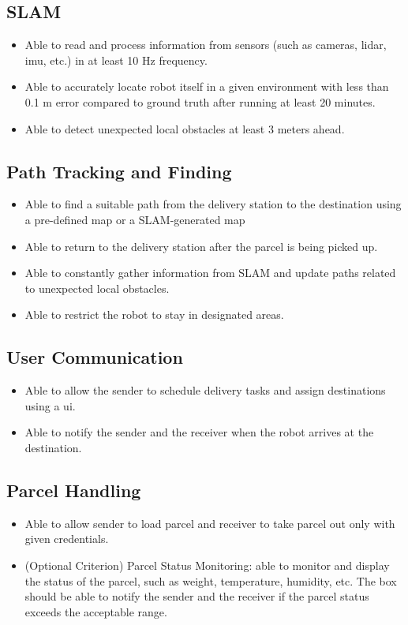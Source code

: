 \documentclass[12pt]{article}
\begin{document}
    \subsection{SLAM}
        \begin{itemize}
            \item Able to read and process information from sensors (such as cameras, \acrshort{lidar}, \acrshort{imu}, etc.) in at least 10 Hz frequency.
            \item Able to accurately locate robot itself in a given environment with less than 0.1 m error compared to ground truth after running at least 20 minutes.
            \item Able to detect unexpected local obstacles at least 3 meters ahead.
        \end{itemize}
    \subsection{Path Tracking and Finding}
        \begin{itemize}
            \item Able to find a suitable path from the delivery station to the destination using a pre-defined map or a SLAM-generated map
            \item Able to return to the delivery station after the parcel is being picked up.
            \item Able to constantly gather information from SLAM and update paths related to unexpected local obstacles.
            \item Able to restrict the robot to stay in designated areas.
        \end{itemize}
    \subsection{User Communication}
        \begin{itemize}
            \item Able to allow the sender to schedule delivery tasks and assign destinations using a \acrshort{ui}.
            \item Able to notify the sender and the receiver when the robot arrives at the destination.
        \end{itemize}     
    \subsection{Parcel Handling}
        \begin{itemize}
           \item Able to allow sender to load parcel and receiver to take parcel out only with given credentials.
            \item (Optional Criterion) Parcel Status Monitoring: able to monitor and display the status of the parcel, such as weight, temperature, humidity, etc. The box should be able to notify the sender and the receiver if the parcel status exceeds the acceptable range.
        \end{itemize}
\end{document}
